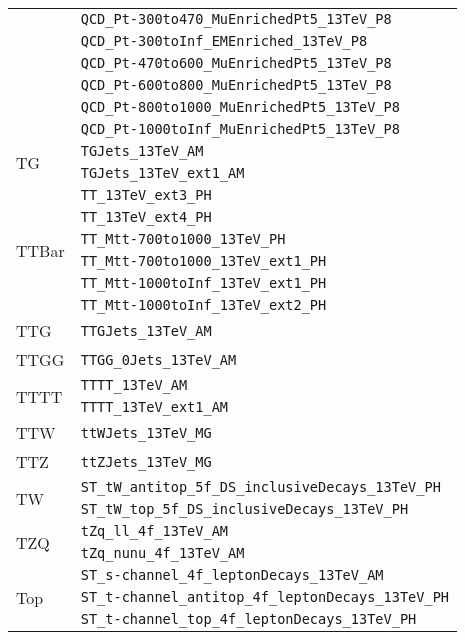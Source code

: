 \begin{longtable}{ll}
 & \texttt{QCD\_Pt-300to470\_MuEnrichedPt5\_13TeV\_P8} \\
 & \texttt{QCD\_Pt-300toInf\_EMEnriched\_13TeV\_P8} \\
 & \texttt{QCD\_Pt-470to600\_MuEnrichedPt5\_13TeV\_P8} \\
 & \texttt{QCD\_Pt-600to800\_MuEnrichedPt5\_13TeV\_P8} \\
 & \texttt{QCD\_Pt-800to1000\_MuEnrichedPt5\_13TeV\_P8} \\
 & \texttt{QCD\_Pt-1000toInf\_MuEnrichedPt5\_13TeV\_P8} \\
\midrule
\multirow{2}{*}{TG} & \texttt{TGJets\_13TeV\_AM} \\
 & \texttt{TGJets\_13TeV\_ext1\_AM} \\
\midrule
\multirow{6}{*}{TTBar} & \texttt{TT\_13TeV\_ext3\_PH} \\
 & \texttt{TT\_13TeV\_ext4\_PH} \\
 & \texttt{TT\_Mtt-700to1000\_13TeV\_PH} \\
 & \texttt{TT\_Mtt-700to1000\_13TeV\_ext1\_PH} \\
 & \texttt{TT\_Mtt-1000toInf\_13TeV\_ext1\_PH} \\
 & \texttt{TT\_Mtt-1000toInf\_13TeV\_ext2\_PH} \\
\midrule
\multirow{1}{*}{TTG} & \texttt{TTGJets\_13TeV\_AM} \\
\midrule
\multirow{1}{*}{TTGG} & \texttt{TTGG\_0Jets\_13TeV\_AM} \\
\midrule
\multirow{2}{*}{TTTT} & \texttt{TTTT\_13TeV\_AM} \\
 & \texttt{TTTT\_13TeV\_ext1\_AM} \\
\midrule
\multirow{1}{*}{TTW} & \texttt{ttWJets\_13TeV\_MG} \\
\midrule
\multirow{1}{*}{TTZ} & \texttt{ttZJets\_13TeV\_MG} \\
\midrule
\multirow{2}{*}{TW} & \texttt{ST\_tW\_antitop\_5f\_DS\_inclusiveDecays\_13TeV\_PH} \\
 & \texttt{ST\_tW\_top\_5f\_DS\_inclusiveDecays\_13TeV\_PH} \\
\midrule
\multirow{2}{*}{TZQ} & \texttt{tZq\_ll\_4f\_13TeV\_AM} \\
 & \texttt{tZq\_nunu\_4f\_13TeV\_AM} \\
\midrule
\multirow{3}{*}{Top} & \texttt{ST\_s-channel\_4f\_leptonDecays\_13TeV\_AM} \\
 & \texttt{ST\_t-channel\_antitop\_4f\_leptonDecays\_13TeV\_PH} \\
 & \texttt{ST\_t-channel\_top\_4f\_leptonDecays\_13TeV\_PH} \\

\end{longtable}
